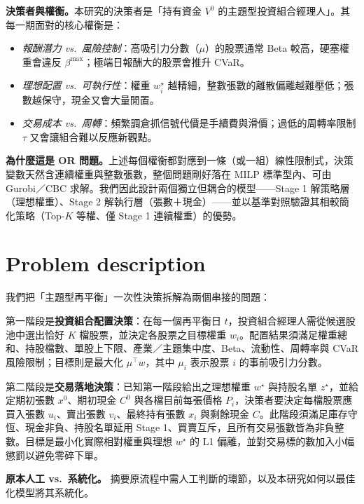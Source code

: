\documentclass[11pt,a4paper]{article}
\newenvironment{itemizeTight}{\begin{itemize}\vspace{-8pt}}{\end{itemize}\vspace{-8pt}}
\begin{document}
\textbf{決策者與權衡。}{}本研究的決策者是「持有資金 $V^0$ 的主題型投資組合經理人」。其每一期面對的核心權衡是：
\begin{itemizeTight}
    \item \emph{報酬潛力 vs.\ 風險控制}：高吸引力分數（$\mu$）的股票通常 Beta 較高，硬塞權重會違反 $\beta^{\max}$；極端日報酬大的股票會推升 CVaR。
    \item \emph{理想配置 vs.\ 可執行性}：權重 $w_i^\star$ 越精細，整數張數的離散偏離越難壓低；張數越保守，現金又會大量閒置。
    \item \emph{交易成本 vs.\ 周轉}：頻繁調倉抓信號代價是手續費與滑價；過低的周轉率限制 $\tau$ 又會讓組合難以反應新觀點。
\end{itemizeTight}

\textbf{為什麼這是 OR 問題。}{}上述每個權衡都對應到一條（或一組）線性限制式，決策變數天然含連續權重與整數張數，整個問題剛好落在 MILP 標準型內、可由 Gurobi／CBC 求解。我們因此設計兩個獨立但耦合的模型——Stage 1 解策略層（理想權重）、Stage 2 解執行層（張數＋現金）——並以基準對照驗證其相較簡化策略（Top-$K$ 等權、僅 Stage 1 連續權重）的優勢。



\section{Problem description}
\label{sec-problem}

我們把「主題型再平衡」一次性決策拆解為兩個串接的問題：

第一階段是\textbf{投資組合配置決策}：在每一個再平衡日 $t$，投資組合經理人需從候選股池中選出恰好 $K$ 檔股票，並決定各股票之目標權重 $w_i$。配置結果須滿足權重總和、持股檔數、單股上下限、產業／主題集中度、Beta、流動性、周轉率與 CVaR 風險限制；目標則是最大化 $\mu^\top w$，其中 $\mu_i$ 表示股票 $i$ 的事前吸引力分數。

第二階段是\textbf{交易落地決策}：已知第一階段給出之理想權重 $w^\star$ 與持股名單 $z^\star$，並給定期初張數 $x^0$、期初現金 $C^0$ 與各檔目前每張價格 $P_i$，決策者要決定每檔股票應買入張數 $u_i$、賣出張數 $v_i$、最終持有張數 $x_i$ 與剩餘現金 $C$。此階段須滿足庫存守恆、現金非負、持股名單延用 Stage 1、買賣互斥，且所有交易張數皆為非負整數。目標是最小化實際相對權重與理想 $w^\star$ 的 L1 偏離，並對交易標的數加入小幅懲罰以避免零碎下單。

\textbf{原本人工 vs.\ 系統化。}{} 摘要原流程中需人工判斷的環節，以及本研究如何以最佳化模型將其系統化。
\end{document}
